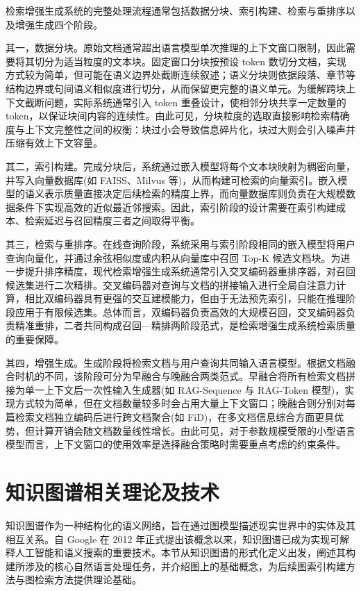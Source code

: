 \documentclass[promaster, vlined]{DissertUESTC}
\begin{document}
检索增强生成系统的完整处理流程通常包括数据分块、索引构建、检索与重排序以及增强生成四个阶段\cite{gao2023retrieval}。

其一，数据分块。原始文档通常超出语言模型单次推理的上下文窗口限制，因此需要将其切分为适当粒度的文本块。固定窗口分块按预设 token 数切分文档，实现方式较为简单，但可能在语义边界处截断连续叙述；语义分块则依据段落、章节等结构边界或句间语义相似度进行切分，从而保留更完整的语义单元。为缓解跨块上下文截断问题，实际系统通常引入 token 重叠设计，使相邻分块共享一定数量的 token，以保证块间内容的连续性。由此可见，分块粒度的选取直接影响检索精确度与上下文完整性之间的权衡：块过小会导致信息碎片化，块过大则会引入噪声并压缩有效上下文容量。

其二，索引构建。完成分块后，系统通过嵌入模型将每个文本块映射为稠密向量，并写入向量数据库(如 FAISS、Milvus 等)，从而构建可检索的向量索引。嵌入模型的语义表示质量直接决定后续检索的精度上界，而向量数据库则负责在大规模数据条件下实现高效的近似最近邻搜索。因此，索引阶段的设计需要在索引构建成本、检索延迟与召回精度三者之间取得平衡。

其三，检索与重排序。在线查询阶段，系统采用与索引阶段相同的嵌入模型将用户查询向量化，并通过余弦相似度或内积从向量库中召回 Top-K 候选文档块。为进一步提升排序精度，现代检索增强生成系统通常引入交叉编码器重排序器，对召回候选集进行二次精排。交叉编码器对查询与文档的拼接输入进行全局自注意力计算，相比双编码器具有更强的交互建模能力，但由于无法预先索引，只能在推理阶段应用于有限候选集\cite{nogueira2019passage}。总体而言，双编码器负责高效的大规模召回，交叉编码器负责精准重排，二者共同构成召回—精排两阶段范式，是检索增强生成系统检索质量的重要保障。

其四，增强生成。生成阶段将检索文档与用户查询共同输入语言模型。根据文档融合时机的不同，该阶段可分为早融合与晚融合两类范式。早融合将所有检索文档拼接为单一上下文后一次性输入生成器(如 RAG-Sequence 与 RAG-Token 模型\cite{lewis2020retrieval})，实现方式较为简单，但在文档数量较多时会占用大量上下文窗口；晚融合则分别对每篇检索文档独立编码后进行跨文档聚合(如 FiD\cite{izacard2021leveraging})，在多文档信息综合方面更具优势，但计算开销会随文档数量线性增长。由此可见，对于参数规模受限的小型语言模型而言，上下文窗口的使用效率是选择融合策略时需要重点考虑的约束条件。

\section{知识图谱相关理论及技术}

知识图谱作为一种结构化的语义网络，旨在通过图模型描述现实世界中的实体及其相互关系。自 Google 在 2012 年正式提出该概念以来，知识图谱已成为实现可解释人工智能和语义搜索的重要技术。本节从知识图谱的形式化定义出发，阐述其构建所涉及的核心自然语言处理任务，并介绍图上的基础概念，为后续图索引构建方法与图检索方法提供理论基础。
\end{document}
